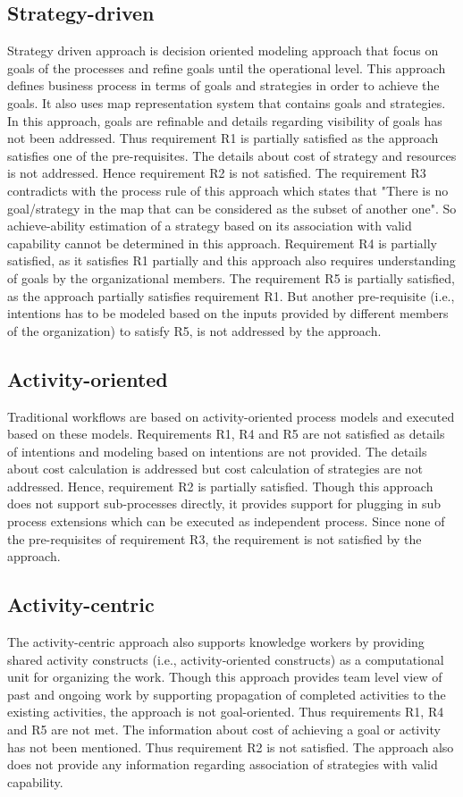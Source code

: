 \subsection{Strategy-driven} 
Strategy driven approach is decision oriented modeling approach that focus on goals of the processes and refine goals until the operational level. This approach defines business process in terms of goals and strategies in order to achieve the goals. It also uses map representation system that contains goals and strategies. In this approach, goals are refinable and details regarding visibility of goals has not been addressed. Thus requirement R1 is partially satisfied as the approach satisfies one of the pre-requisites. The details about cost of strategy and resources is not addressed. Hence requirement R2 is not satisfied. The requirement R3 contradicts with the process rule of this approach which states that "There is no goal/strategy in the map that can be considered as the subset of another one". So achieve-ability estimation of a strategy based on its association with valid capability cannot be determined in this approach. Requirement R4 is partially satisfied, as it satisfies R1 partially and this approach also requires understanding of goals by the organizational members. The requirement R5 is partially satisfied, as the approach partially satisfies requirement R1. But another pre-requisite (i.e., intentions has to be modeled based on the inputs provided by different members of the organization) to satisfy R5, is not addressed by the approach. 

\subsection{Activity-oriented} 
Traditional workflows are based on activity-oriented process models and executed based on these models. Requirements R1, R4 and R5 are not satisfied as details of intentions and modeling based on intentions are not provided. The details about cost calculation is addressed but cost calculation of strategies are not addressed. Hence, requirement R2 is partially satisfied. Though this approach does not support sub-processes directly, it provides support for plugging in sub process extensions which can be executed as independent process. Since none of the pre-requisites of requirement R3, the requirement is not satisfied by the approach. 

\subsection{Activity-centric} 
The activity-centric approach also supports knowledge workers by providing shared activity constructs (i.e., activity-oriented constructs) as a computational unit for organizing the work. Though this approach provides team level view of past and ongoing work by supporting propagation of completed activities to the existing activities, the approach is not goal-oriented. Thus requirements R1, R4 and R5 are not met. The information about cost of achieving a goal or activity has not been mentioned. Thus requirement R2 is not satisfied. The approach also does not provide any information regarding association of strategies with valid capability.  
 
